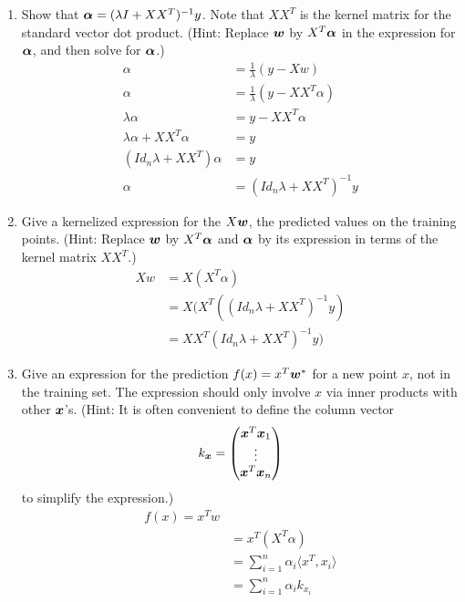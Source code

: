\documentclass{article}
\theoremstyle{plain}
\theoremstyle{definition}
\begin{document}
\begin{enumerate}
\item Show that $\boldsymbol{\alpha}=(\lambda I+XX^{T})^{-1}y$. Note that $XX^{T}$
is the kernel matrix for the standard vector dot product. (Hint: Replace
$\boldsymbol{w}$ by $X^{T}\boldsymbol{\alpha}$ in the expression for $\boldsymbol{\alpha}$, and then solve
for $\boldsymbol{\alpha}$.)\\
\subitem
\begin{equation}
    \begin{split}
        \alpha &= \frac{1}{\lambda} (y-Xw) \\
       \alpha &= \frac{1}{\lambda} (y-XX^T\alpha) \\
       \lambda \alpha &= y - XX^T\alpha \\
       \lambda \alpha + XX^T\alpha &= y \\
       (Id_n \lambda + XX^T) \alpha &= y \\
       \alpha &= (Id_n \lambda + XX^T)^{-1} y
    \end{split}
\end{equation}
\item Give a kernelized expression for the $X\boldsymbol{w}$, the predicted values on
the training points. (Hint: Replace $\boldsymbol{w}$ by $X^{T}\boldsymbol{\alpha}$ and $\boldsymbol{\alpha}$
by its expression in terms of the kernel matrix $XX^{T}$.)\\
\subitem
\begin{equation}
    \begin{split}
        Xw &= X(X^T\alpha) \\
        &= X(X^T((Id_n \lambda + XX^T)^{-1} y)\\
        &= XX^T(Id_n \lambda + XX^T)^{-1} y)
    \end{split}
\end{equation}
\item Give an expression for the prediction $f(x)=x^{T}\boldsymbol{w}^{*}$ for a new
point $x$, not in the training set. The expression should only involve
$x$ via inner products with other $\boldsymbol{x}$'s. (Hint: It is often convenient
to define the column vector
\[
k_{\boldsymbol{x}}=\begin{pmatrix}\boldsymbol{x}^{T}\boldsymbol{x}_{1}\\
\vdots\\
\boldsymbol{x}^{T}\boldsymbol{x}_{n}
\end{pmatrix}
\]
to simplify the expression.) \\
\setcounter{saveenum}{\value{enumi}}
\subitem
\begin{equation}
    \begin{split}
        f(x) = x^Tw \\
        &= x^T(X^T\alpha) \\
        &= \sum_{i=1}^n \alpha_i \langle x^T,x_i \rangle \\
        &= \sum_{i=1}^n \alpha_i k_x_i
    \end{split}
\end{equation}
\end{enumerate}
\end{document}
